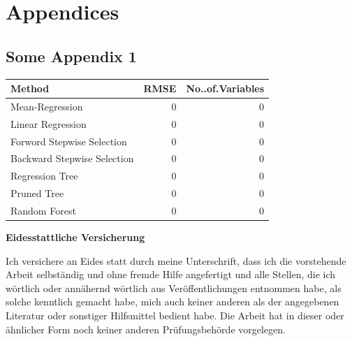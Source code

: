 \documentclass[11pt,]{article}
\begin{document}
\cleardoublepage
\appendix

\hypertarget{appendices}{%
\section{Appendices}\label{appendices}}

\hypertarget{some-appendix-1}{%
\subsection{Some Appendix 1}\label{some-appendix-1}}

\begin{tabular}{l|r|r}
\hline
Method & RMSE & No..of.Variables\\
\hline
Mean-Regression & 0 & 0\\
\hline
Linear Regression & 0 & 0\\
\hline
Forword Stepwise Selection & 0 & 0\\
\hline
Backward Stepwise Selection & 0 & 0\\
\hline
Regression Tree & 0 & 0\\
\hline
Pruned Tree & 0 & 0\\
\hline
Random Forest & 0 & 0\\
\hline
\end{tabular}

\newpage
\textbf{Eidesstattliche Versicherung}

\bigskip

Ich versichere an Eides statt durch meine Unterschrift, dass ich die vorstehende Arbeit selbständig und ohne fremde Hilfe angefertigt und alle Stellen, die ich wörtlich oder annähernd wörtlich aus Veröffentlichungen entnommen habe, als solche kenntlich gemacht habe, mich auch keiner anderen als der angegebenen Literatur oder sonstiger Hilfsmittel bedient habe. Die Arbeit hat in dieser oder ähnlicher Form noch keiner anderen Prüfungsbehörde vorgelegen.

\vspace{1cm}
\rule{0pt}{2\baselineskip} %
\par\noindent{} \hfill\makebox[2.25in]{\hrulefill}%
\par\noindent\makebox[2.25in][l]{} \hfill{}%
\end{document}
